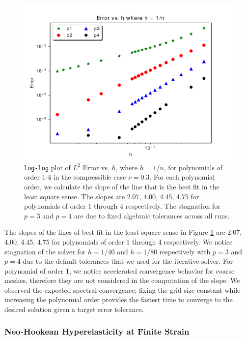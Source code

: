 \begin{figure}[hbt!]
 \begin{center}
      \includegraphics[width=1\textwidth]{../img/conv.pdf}
\end{center}
\caption{
\texttt{log-log} plot of $L^2$ Error vs. $h$, where $h = 1/n$, for polynomials of order 1-4 in the compressible case $\nu = 0.3$.
For each polynomial order, we calculate the slope of the line that is the best fit in the least square sense.
The slopes are 2.07, 4.00, 4.45, 4.75 for polynomials of order 1 through 4 respectively.
The stagnation for $p = 3$ and $p = 4$ are due to fixed algebraic tolerances across all runs.
}
    \label{fig:lin-elas-conv}
\end{figure}

The slopes of the lines of best fit in the least square sense in Figure \ref{fig:lin-elas-conv} are 2.07, 4.00, 4.45, 4.75 for polynomials of order 1 through 4 respectively.
We notice stagnation of the solver for $h = 1/40$ and $h = 1/80$ respectively with $p = 3$ and $p = 4$ due to the default tolerances that we used for the iterative solver.
For polynomial of order 1, we notice accelerated convergence behavior for coarse meshes, therefore they are not considered in the computation of the slope.
We observed the expected spectral convergence; fixing the grid size constant while increasing the polynomial order provides the fastest time to converge to the desired solution given a target error tolerance.

\subsubsection{Neo-Hookean Hyperelasticity at Finite Strain}

